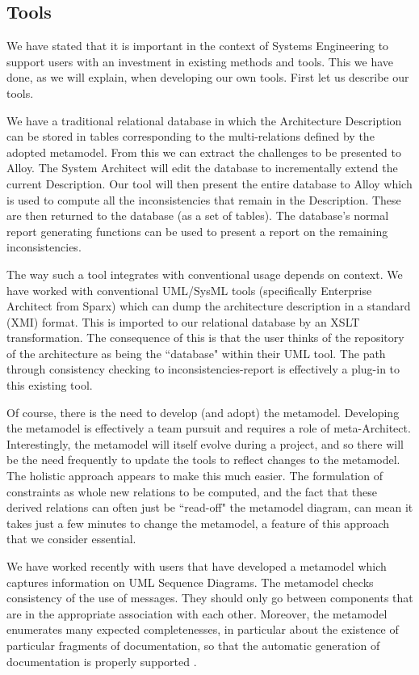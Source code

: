 \documentclass[a4paper,twoside]{article}
\begin{document}
\subsection{Tools}

\noindent We have stated that it is important in the context of Systems Engineering to support users with an investment in existing methods and tools. This we have done, as we will explain, when developing our own tools. First let us describe our tools.

We have a traditional relational database in which the Architecture Description can be stored in tables corresponding to the multi-relations defined by the adopted metamodel. From this we can extract the challenges to be presented to Alloy. The System Architect will edit the database to incrementally extend the current Description. Our tool will then present the entire database to Alloy which is used to compute all the inconsistencies that remain in the Description. These are then returned to the database (as a set of tables). The database's normal report generating functions can be used to present a report on the remaining inconsistencies.

The way such a tool integrates with conventional usage depends on context. We have worked with conventional UML/SysML tools (specifically Enterprise Architect from Sparx) which can dump the architecture description in a standard (XMI) format. This is imported to our relational database by an XSLT transformation. The consequence of this is that the user thinks of the repository of the architecture as being the ``database" within their UML tool. The path through consistency checking to inconsistencies-report is effectively a plug-in to this existing tool.

Of course, there is the need to develop (and adopt) the metamodel. Developing the metamodel is effectively a team pursuit and requires a role of meta-Architect. Interestingly, the metamodel will itself evolve during a project, and so there will be the need frequently to update the tools to reflect changes to the metamodel. The holistic approach appears to make this much easier. The formulation of constraints as whole new relations to be computed, and the fact that these derived relations can often just be ``read-off" the metamodel diagram, can mean it takes just a few minutes to change the metamodel, a feature of this approach that we consider essential.

We have worked recently with users that have developed a metamodel which captures information on UML Sequence Diagrams. The metamodel checks consistency of the use of messages. They should only go between components that are in the appropriate association with each other. Moreover, the metamodel enumerates many expected completenesses, in particular about the existence of particular fragments of documentation, so that the automatic generation of documentation is properly supported \cite{Henderson3}. 
\end{document}
